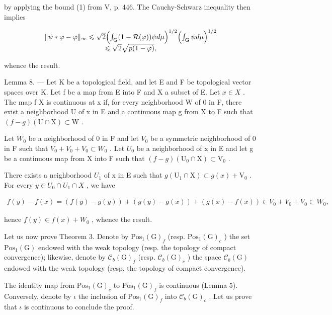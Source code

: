 by applying the bound (1) from V, p. 446. The Cauchy-Schwarz inequality then implies

\[
\begin{array}{c} \| \psi * \varphi - \varphi \| _ {\infty} \leqslant \sqrt {2} \Bigl (\int_ {\mathrm{G}} (1 - \mathcal {R} (\varphi)) \psi   d \mu \Bigr) ^ {1 / 2} \Bigl (\int_ {\mathrm{G}} \psi   d \mu \Bigr) ^ {1 / 2} \\ \leqslant \sqrt {2} \sqrt {p (1 - \varphi)}, \end{array}
\]

whence the result.

Lemma 8. --- Let K be a topological field, and let E and F be topological vector spaces over K. Let f be a map from E into F and X a subset of E. Let \(x \in X\) . The map f \textbar{} X is continuous at x if, for every neighborhood W of 0 in F, there exist a neighborhood U of x in E and a continuous map g from X to F such that \((f - g)(\mathrm{U} \cap \mathrm{X}) \subset \mathrm{W}\) .

Let \(W_{0}\) be a neighborhood of 0 in F and let \(V_{0}\) be a symmetric neighborhood of 0 in F such that \(V_{0} + V_{0} + V_{0} \subset W_{0}\) . Let \(U_{0}\) be a neighborhood of x in E and let g be a continuous map from X into F such that \((f - g)(\mathrm{U}_{0} \cap \mathrm{X}) \subset \mathrm{V}_{0}\) .

There exists a neighborhood \(U_{1}\) of x in E such that \(g(\mathrm{U}_{1} \cap \mathrm{X}) \subset g(x) + \mathrm{V}_{0}\) . For every \(y \in U_{0} \cap U_{1} \cap X\) , we have

\[
\begin{array}{c} f (y) - f (x) = (f (y) - g (y)) + (g (y) - g (x)) + (g (x) - f (x)) \in V_{0} + V_{0} + V_{0} \subset W_{0}, \end{array}
\]

hence \(f(y) \in f(x) + W_{0}\) , whence the result.

Let us now prove Theorem 3. Denote by \(\mathrm{Pos}_{1}(\mathrm{G})_{f}\) (resp. \(\mathrm{Pos}_{1}(\mathrm{G})_{c}\) ) the set \(\mathrm{Pos}_{1}(\mathrm{G})\) endowed with the weak topology (resp. the topology of compact convergence); likewise, denote by \(\mathcal{C}_{b}(\mathrm{G})_{f}\) (resp. \(\mathcal{C}_{b}(\mathrm{G})_{c}\) ) the space \(\mathcal{C}_{b}(\mathrm{G})\) endowed with the weak topology (resp. the topology of compact convergence).

The identity map from \(\mathrm{Pos}_{1}(\mathrm{G})_{c}\) to \(\mathrm{Pos}_{1}(\mathrm{G})_{f}\) is continuous (Lemma 5). Conversely, denote by \(\iota\) the inclusion of \(\mathrm{Pos}_{1}(\mathrm{G})_{f}\) into \(\mathcal{C}_{b}(\mathrm{G})_{c}\) . Let us prove that \(\iota\) is continuous to conclude the proof.

